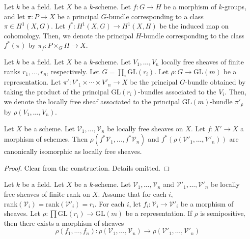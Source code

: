 \begin{definition}
Let $k$ be a field.
Let $X$ be a $k$-scheme.
Let $f:G\to H$ be a morphism of $k$-groups, and let $\pi:P\to X$ be a principal
$G$-bundle corresponding to a class $\pi\in H^1(X,G)$.
Let $f^{*}:H^1(X,G)\to H^1(X,H)$ be the induced map on cohomology.
Then, we denote the principal $H$-bundle corresponding to the class
$f^{*}(\pi)$ by $\pi_f:P\times_{G}H\to X$.
\end{definition}

\begin{definition}
Let $k$ be a field.
Let $X$ be a $k$-scheme.
Let $V_1,\ldots,V_n$ locally free sheaves of finite ranks $r_1,\dots, r_n$, respectively.
Let $G=\prod_i \mathrm{GL}(r_i)$.
Let $\rho:G\rightarrow \mathrm{GL}(m)$ be a representation.
Let $\pi':V'_1\times\cdots\times V'_n\to X$ be the principal $G$-bundle
obtained by taking the product of the principal $\mathrm{GL}(r_i)$-bundles
associated to the $V_i$.
Then, we denote the locally free sheaf associated to the principal
$\mathrm{GL}(m)$-bundle $\pi'_{\rho}$ by $\rho(V_1,\dots, V_n)$.
\end{definition}

\begin{lemma}\label{pullback_and_rho_commute}
Let $X$ be a scheme.
Let $\mathcal{V}_1,\ldots,\mathcal{V}_n$ be locally free sheaves on $X$. Let
$f:X'\rightarrow X$ a morphism of schemes.
Then $\rho(f^*\mathcal{V}_1,\dots,f^*\mathcal{V}_n)$ and
$f^*(\rho(\mathcal{V}'_1,\dots,\mathcal{V}'_n))$ are canonically isomorphic as
locally free sheaves.
\end{lemma}

\begin{proof}
Clear from the construction. Details omitted.
\end{proof}


\begin{lemma}\label{functoriality_rho}
Let $k$ be a field.
Let $X$ be a $k$-scheme.
Let $\mathcal{V}_1,\dots, \mathcal{V}_n$ and
$\mathcal{V}'_1,\dots,\mathcal{V}'_n$ be locally free sheaves of finite rank on
$X$.
Assume that for each $i$,
$\mathrm{rank}(\mathcal{V}_i)=\mathrm{rank}(\mathcal{V}'_i)=r_i$.
For each $i$, let $f_i:\mathcal{V}_i\rightarrow \mathcal{V}'_i$ be a morphism
of sheaves.
Let $\rho:\prod\mathrm{GL}(r_i)\to\mathrm{GL}(m)$ be a representation.
If $\rho$ is semipositive, then there exists a morphism of sheaves
$$
  \rho(f_1,\dots, f_n) :
    \rho(\mathcal{V}_1,\ldots,\mathcal{V}_n) \rightarrow
    \rho(\mathcal{V}'_1,\dots,\mathcal{V}'_n)
$$
\end{lemma}

